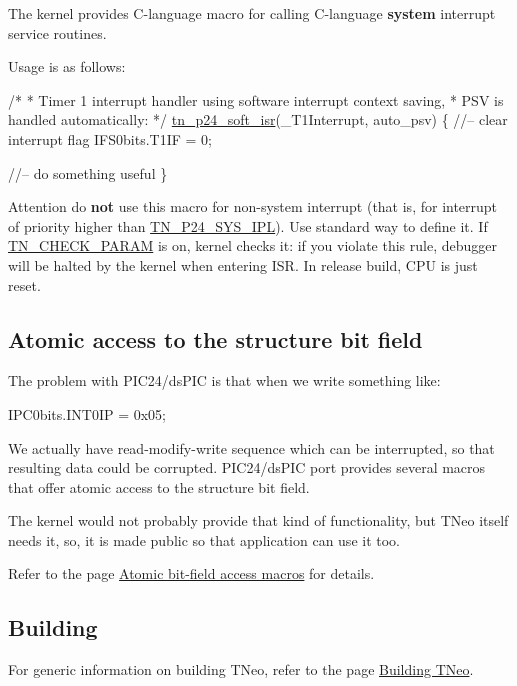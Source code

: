 The kernel provides C-\/language macro for calling C-\/language {\bfseries system} interrupt service routines.

Usage is as follows\+:


\begin{DoxyCode}
\textcolor{comment}{/* }
\textcolor{comment}{ * Timer 1 interrupt handler using software interrupt context saving,  }
\textcolor{comment}{ * PSV is handled automatically:}
\textcolor{comment}{ */}
\hyperlink{tn__arch__pic24_8h_a0b184d3c15066f5504144379d2624ff3}{tn\_p24\_soft\_isr}(\_T1Interrupt, auto\_psv)
\{
   \textcolor{comment}{//-- clear interrupt flag}
   IFS0bits.T1IF = 0;

   \textcolor{comment}{//-- do something useful}
\}
\end{DoxyCode}


\begin{DoxyAttention}{Attention}
do {\bfseries not} use this macro for non-\/system interrupt (that is, for interrupt of priority higher than {\ttfamily \hyperlink{tn__cfg__default_8h_a4feb7eb34fc2f175167b7496b63c398a}{T\+N\+\_\+\+P24\+\_\+\+S\+Y\+S\+\_\+\+I\+PL}}). Use standard way to define it. If {\ttfamily \hyperlink{tn__cfg__default_8h_a1f197294df3276fec431930545acafd5}{T\+N\+\_\+\+C\+H\+E\+C\+K\+\_\+\+P\+A\+R\+AM}} is on, kernel checks it\+: if you violate this rule, debugger will be halted by the kernel when entering I\+SR. In release build, C\+PU is just reset.
\end{DoxyAttention}
\hypertarget{arch_specific_pic24_bfa}{}\subsection{Atomic access to the structure bit field}\label{arch_specific_pic24_bfa}
The problem with P\+I\+C24/ds\+P\+IC is that when we write something like\+:


\begin{DoxyCode}
IPC0bits.INT0IP = 0x05;
\end{DoxyCode}


We actually have read-\/modify-\/write sequence which can be interrupted, so that resulting data could be corrupted. P\+I\+C24/ds\+P\+IC port provides several macros that offer atomic access to the structure bit field.

The kernel would not probably provide that kind of functionality, but T\+Neo itself needs it, so, it is made public so that application can use it too.

Refer to the page \hyperlink{tn__arch__pic24__bfa_8h}{Atomic bit-\/field access macros} for details.\hypertarget{arch_specific_pic24_building}{}\subsection{Building}\label{arch_specific_pic24_building}
For generic information on building T\+Neo, refer to the page \hyperlink{building}{Building T\+Neo}.

